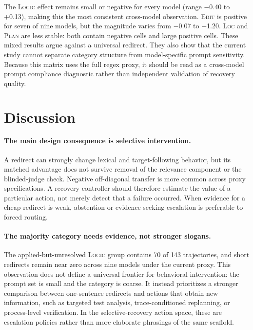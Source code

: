 \documentclass{article}
\begin{document}
The \textsc{Logic} effect remains small or negative for every model (range
$-$0.40 to +0.13), making this the most consistent cross-model observation.
\textsc{Edit} is positive for seven of nine models, but the magnitude varies
from $-$0.07 to +1.20.  \textsc{Loc} and \textsc{Plan} are less stable: both
contain negative cells and large positive cells.  These mixed results argue
against a universal redirect.  They also show that the current study cannot
separate category structure from model-specific prompt sensitivity.  Because
this matrix uses the full regex proxy, it should be read as a cross-model prompt
compliance diagnostic rather than independent validation of recovery quality.


\FloatBarrier
\section{Discussion}
\label{sec:discussion}

\paragraph{The main design consequence is selective intervention.}
A redirect can strongly change lexical and target-following behavior, but its
matched advantage does not survive removal of the relevance component or the
blinded-judge check.  Negative off-diagonal transfer is more common across
proxy specifications.  A recovery controller should therefore estimate the
value of a particular action, not merely detect that a failure occurred.  When
evidence for a cheap redirect is weak, abstention or evidence-seeking escalation
is preferable to forced routing.

\paragraph{The majority category needs evidence, not stronger slogans.}
The applied-but-unresolved \textsc{Logic} group contains 70 of 143 trajectories,
and short redirects remain near zero across nine models under the current
proxy.  This observation does not define a universal frontier for behavioral
intervention: the prompt set is small and the category is coarse.  It instead
prioritizes a stronger comparison between one-sentence redirects and actions
that obtain new information, such as targeted test analysis, trace-conditioned
replanning, or process-level verification.  In the selective-recovery action
space, these are escalation policies rather than more elaborate phrasings of
the same scaffold.
\end{document}
